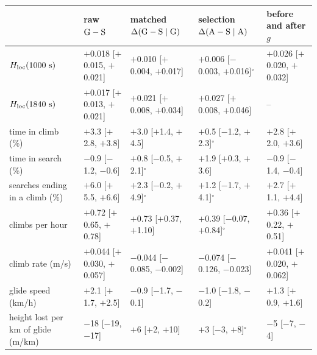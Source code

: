 \begin{tabular}{@{}l l l l l@{}}
\toprule
 & raw $\mathrm{G}-\mathrm{S}$ & matched $\Delta(\mathrm{G}-\mathrm{S}\mid\mathrm{G})$ & selection $\Delta(\mathrm{A}-\mathrm{S}\mid\mathrm{A})$ & before and after $g$ \\
\midrule
$H_\mathrm{loc}(1000~\mathrm{s})$ & $+$0.018 [$+$0.015, $+$0.021] & $+$0.010 [$+$0.004, $+$0.017] & $+$0.006 [$-$0.003, $+$0.016]$^\circ$ & $+$0.026 [$+$0.020, $+$0.032] \\
$H_\mathrm{loc}(1840~\mathrm{s})$ & $+$0.017 [$+$0.013, $+$0.021] & $+$0.021 [$+$0.008, $+$0.034] & $+$0.027 [$+$0.008, $+$0.046] & -- \\
time in climb (\%) & $+$3.3 [$+$2.8, $+$3.8] & $+$3.0 [$+$1.4, $+$4.5] & $+$0.5 [$-$1.2, $+$2.3]$^\circ$ & $+$2.8 [$+$2.0, $+$3.6] \\
time in search (\%) & $-$0.9 [$-$1.2, $-$0.6] & $+$0.8 [$-$0.5, $+$2.1]$^\circ$ & $+$1.9 [$+$0.3, $+$3.6] & $-$0.9 [$-$1.4, $-$0.4] \\
searches ending in a climb (\%) & $+$6.0 [$+$5.5, $+$6.6] & $+$2.3 [$-$0.2, $+$4.9]$^\circ$ & $+$1.2 [$-$1.7, $+$4.1]$^\circ$ & $+$2.7 [$+$1.1, $+$4.4] \\
climbs per hour & $+$0.72 [$+$0.65, $+$0.78] & $+$0.73 [$+$0.37, $+$1.10] & $+$0.39 [$-$0.07, $+$0.84]$^\circ$ & $+$0.36 [$+$0.22, $+$0.51] \\
climb rate (m/s) & $+$0.044 [$+$0.030, $+$0.057] & $-$0.044 [$-$0.085, $-$0.002] & $-$0.074 [$-$0.126, $-$0.023] & $+$0.041 [$+$0.020, $+$0.062] \\
glide speed (km/h) & $+$2.1 [$+$1.7, $+$2.5] & $-$0.9 [$-$1.7, $-$0.1] & $-$1.0 [$-$1.8, $-$0.2] & $+$1.3 [$+$0.9, $+$1.6] \\
height lost per km of glide (m/km) & $-$18 [$-$19, $-$17] & $+$6 [$+$2, $+$10] & $+$3 [$-$3, $+$8]$^\circ$ & $-$5 [$-$7, $-$4] \\
\bottomrule
\end{tabular}
